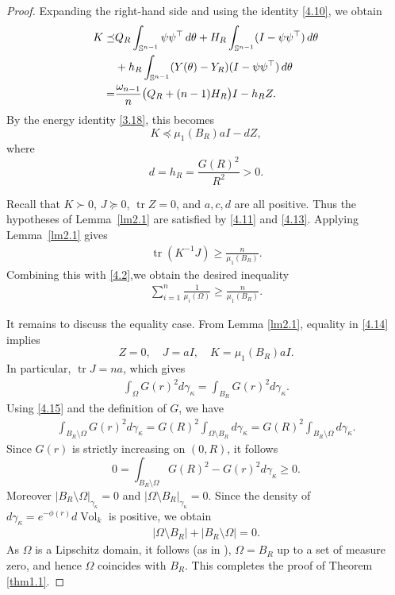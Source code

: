 \documentclass[11pt,leqno]{amsart}
\def\k{\kappa}
\def\Sph{\Bbb S}
\def\k{\kappa}
\def\V{\operatorname{Vol}}
\def\tr{\operatorname{tr}}
\def\tr{\operatorname{tr}}
\numberwithin{equation}{section}
\begin{document}
\begin{proof}
Expanding the right-hand side and using the identity \eqref{4.10}, we obtain
\begin{align*}
\begin{aligned}
K
\preceq&
Q_R\int_{\Sph^{n-1}}\psi\psi^\top \,d\theta
+
H_R\int_{\Sph^{n-1}}(I-\psi\psi^\top )\,d\theta\\
&+
h_R\int_{\Sph^{n-1}}(Y(\theta)-Y_R)(I-\psi\psi^\top)\,d\theta \\
=&\frac{\omega_{n-1}}{n}\bigl(Q_R+(n-1)H_R\bigr)I-h_RZ.
\end{aligned}
\end{align*}
By the energy identity \eqref{3.18}, this becomes
\begin{equation}\label{4.13}
        K\preceq \mu_{1}(B_R) aI-dZ,
\end{equation}
where
\begin{equation*}
        d=h_R=\frac{G(R)^2}{R^2}>0.
\end{equation*}

Recall that  $K\succ 0$, $J\succeq0$, $\tr Z=0$, and
$a,c,d$ are all positive.  Thus the hypotheses of Lemma~\ref{lm2.1} are satisfied by
\eqref{4.11} and \eqref{4.13}. Applying Lemma~\ref{lm2.1}
gives
\begin{align*}
        \tr(K^{-1}J)\geq \frac{n}{\mu_{1}(B_R)}.
\end{align*}
Combining this with \eqref{4.2},we obtain the desired inequality
\begin{align}\label{4.14}
    \sum_{i=1}^{n}\frac{1}{\mu_{i}(\Omega)}\geq \frac{n}{\mu_{1}(B_R)}.
\end{align}

It remains to discuss the equality case. From Lemma  \ref{lm2.1}, equality in  \eqref{4.14} implies
$$
Z=0, \quad J=aI, \quad K=\mu_{1}(B_R)aI.
$$
In particular, 
$\tr J=na$, which gives 
\begin{align}\label{4.15}
    \int_{\Omega}G(r)^{2}d\gamma_{\k}=\int_{B_R}G(r)^{2}d\gamma_{\k}.
\end{align}
Using \eqref{4.15} and the definition of $G$, we have 
\begin{align*}
\int_{B_R\setminus\Omega}G(r)^{2}d\gamma_{\k}=G(R)^{2}\int_{\Omega\setminus B_R}d\gamma_{\k}=G(R)^{2}\int_{B_R\setminus \Omega}d\gamma_{\k}.
\end{align*}
Since $G(r)$ is strictly increasing on $(0,R)$, it follows
$$
0=\int_{B_R\setminus \Omega}G(R)^{2}-G(r)^{2}d\gamma_{\k}\geq 0.
$$
Moreover $|B_R\setminus \Omega|_{\gamma_{\k}}=0$ and $|\Omega\setminus B_R|_{\gamma_{\k}}=0$. 
Since the density of $d\gamma_{\k}=e^{-\phi(r)}d\V_k$ is positive, we obtain
\begin{align*}
    |\Omega\setminus B_R|+   |B_R\setminus \Omega|=0.
\end{align*}
As $\Omega$ is a Lipschitz domain, it follows (as in \cite{Fr26}),  $\Omega=B_R$ up to a set of measure zero, and hence $\Omega$ coincides with $B_R$. This completes the proof of Theorem \ref{thm1.1}.
\end{proof}


 
	
\end{document}
